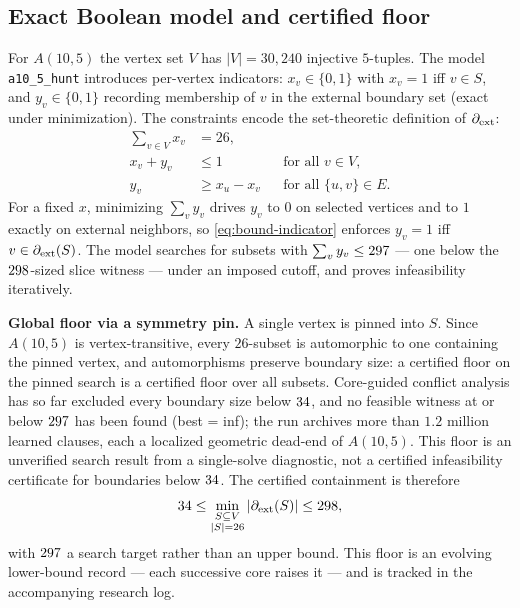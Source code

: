 \subsection{Exact Boolean model and certified floor}

For $A(10,5)$ the vertex set $V$ has $|V| = 30{,}240$ injective $5$-tuples.  The
model \texttt{a10\_5\_hunt} introduces per-vertex indicators: $x_v \in \{0,1\}$
with $x_v = 1$ iff $v \in S$, and $y_v \in \{0,1\}$ recording membership of $v$
in the external boundary set (exact under minimization).  The constraints
encode the set-theoretic definition of $\partial_{\mathrm{ext}}$:
\begin{align}
	\sum_{v \in V} x_v &= 26, \label{eq:volume} \\
	x_v + y_v &\le 1 && \text{for all } v \in V, \label{eq:excl} \\
	y_v &\ge x_u - x_v && \text{for all } \{u,v\} \in E. \label{eq:bound-indicator}
\end{align}
For a fixed $x$, minimizing $\sum_v y_v$ drives $y_v$ to $0$ on selected
vertices and to $1$ exactly on external neighbors, so \eqref{eq:bound-indicator}
enforces $y_v = 1$ iff $v \in \partial_{\mathrm{ext}}(S)$.  The model searches for subsets with
$\sum_v y_v \le 297{}$ --- one below the $298{}$-sized slice
witness --- under an imposed cutoff, and proves infeasibility iteratively.

\textbf{Global floor via a symmetry pin.}  A single vertex is pinned into $S$.
Since $A(10,5)$ is vertex-transitive, every $26$-subset is automorphic to one
containing the pinned vertex, and automorphisms preserve boundary size: a
certified floor on the pinned search is a certified floor over all subsets.
Core-guided conflict analysis has so far excluded every boundary size below
$34{}$, and no feasible witness at or below $297{}$ has been
found (best = inf); the run archives more than $1.2$ million learned clauses,
each a localized geometric dead-end of $A(10,5)$.  This floor is an unverified
search result from a single-solve diagnostic, not a certified infeasibility
certificate for boundaries below $34{}$.  The certified containment is
therefore
\[
	34{} \le \min_{\substack{S \subseteq V\\ |S| = 26}} |\partial_{\mathrm{ext}}(S)|
	\le 298{},
\]
with $297{}$ a search target rather than an upper bound.  This floor is
an evolving lower-bound record --- each successive core raises it --- and is
tracked in the accompanying research log.

